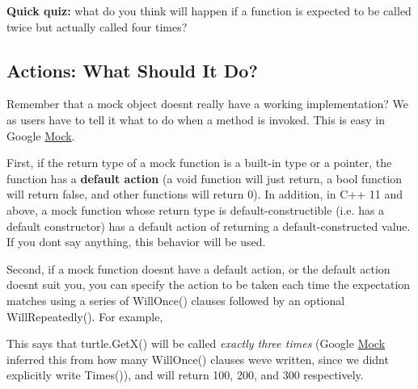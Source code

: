 {\bfseries{Quick quiz\+:}} what do you think will happen if a function is expected to be called twice but actually called four times?

\subsection*{Actions\+: What Should It Do?}

Remember that a mock object doesn\textquotesingle{}t really have a working implementation? We as users have to tell it what to do when a method is invoked. This is easy in Google \mbox{\hyperlink{class_mock}{Mock}}.

First, if the return type of a mock function is a built-\/in type or a pointer, the function has a {\bfseries{default action}} (a {\ttfamily void} function will just return, a {\ttfamily bool} function will return {\ttfamily false}, and other functions will return 0). In addition, in C++ 11 and above, a mock function whose return type is default-\/constructible (i.\+e. has a default constructor) has a default action of returning a default-\/constructed value. If you don\textquotesingle{}t say anything, this behavior will be used.

Second, if a mock function doesn\textquotesingle{}t have a default action, or the default action doesn\textquotesingle{}t suit you, you can specify the action to be taken each time the expectation matches using a series of {\ttfamily Will\+Once()} clauses followed by an optional {\ttfamily Will\+Repeatedly()}. For example,


\begin{DoxyCode}{0}
\end{DoxyCode}


This says that {\ttfamily turtle.\+Get\+X()} will be called {\itshape exactly three times} (Google \mbox{\hyperlink{class_mock}{Mock}} inferred this from how many {\ttfamily Will\+Once()} clauses we\textquotesingle{}ve written, since we didn\textquotesingle{}t explicitly write {\ttfamily Times()}), and will return 100, 200, and 300 respectively.


\begin{DoxyCode}{0}
\end{DoxyCode}



